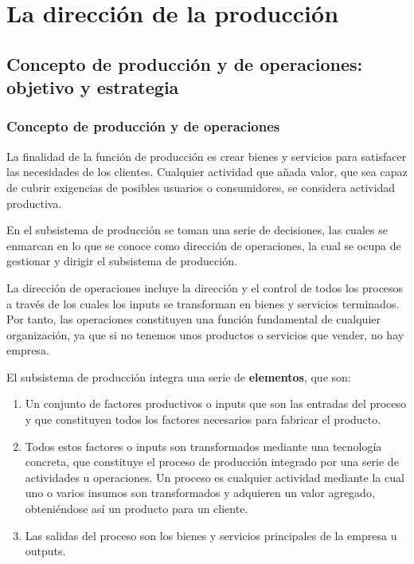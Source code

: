 \documentclass[10pt,a4paper,spanish]{report}
\begin{document}
\chapter{\textcolor[rgb]{0.9,0.7,0.6}La dirección de la producción}

      \section{\textcolor[rgb]{0.9,0.7,0.6}Concepto de producción y de operaciones: objetivo y estrategia}

            \subsection{\textcolor[rgb]{0.9,0.7,0.6}Concepto de producción y de operaciones}

                  La finalidad de la función de producción es crear bienes y servicios para satisfacer las necesidades de los clientes. Cualquier actividad que añada valor, que sea capaz de cubrir exigencias de posibles usuarios o consumidores, se considera actividad productiva.

                  En el subsistema de producción se toman una serie de decisiones, las cuales se enmarcan en lo que se conoce como dirección de operaciones, la cual se ocupa de gestionar y dirigir el subsistema de producción.

                  La dirección de operaciones incluye la dirección y el control de todos los procesos a través de los cuales los inputs se transforman en bienes y servicios terminados. Por tanto, las operaciones constituyen una función fundamental de cualquier organización, ya que si no tenemos unos productos o servicios que vender, no hay empresa.

                  El subsistema de producción integra una serie de \textbf{elementos}, que son:
                  \begin{enumerate}[--]
                        \item Un conjunto de factores productivos o inputs que son las entradas del proceso y que constituyen todos los factores necesarios para fabricar el producto.

                        \item Todos estos factores o inputs son transformados mediante una tecnología concreta, que constituye el proceso de producción integrado por una serie de actividades u operaciones. Un proceso es cualquier actividad mediante la cual uno o varios insumos son transformados y adquieren un valor agregado, obteniéndose así un producto para un cliente.

                        \item Las salidas del proceso son los bienes y servicios principales de la empresa u outputs.
                  \end{enumerate}
\end{document}
